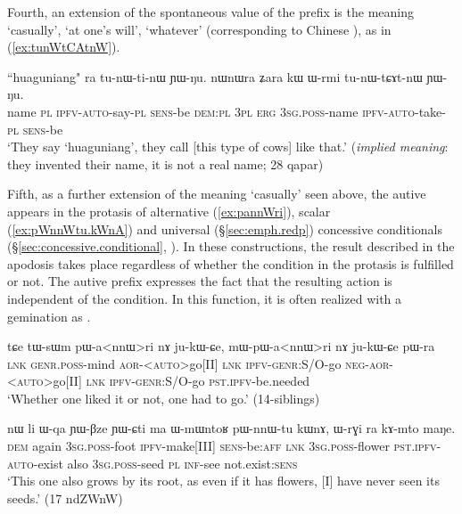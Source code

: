 Fourth, an extension of the spontaneous value of the prefix  is the meaning `casually', `at one's will', `whatever' (corresponding to Chinese ), as in (\ref{ex:tunWtCAtnW}). 

\begin{exe}
\ex \label{ex:tunWtCAtnW}
\gll ``huaguniang" ra tu-nɯ-ti-nɯ ɲɯ-ŋu. nɯnɯra ʑara kɯ ɯ-rmi tu-nɯ-tɕɤt-nɯ ɲɯ-ŋu.  \\
name \textsc{pl}	\textsc{ipfv}-\textsc{auto}-say-\textsc{pl}	\textsc{sens}-be	\textsc{dem}:\textsc{pl}	\textsc{3pl}	\textsc{erg}	\textsc{3sg}.\textsc{poss}-name	\textsc{ipfv}-\textsc{auto}-take-\textsc{pl}	\textsc{sens}-be\\
\glt `They say `huaguniang', they call [this type of cows] like that.' (\textit{implied meaning}: they invented their name, it is not a real name; 28 qapar) 
\end{exe}

Fifth, as a further extension of the meaning `casually' seen above, the autive appears in the protasis of alternative (\ref{ex:pannWri}), scalar (\ref{ex:pWnnWtu.kWnA}) and universal (§\ref{sec:emph.redp}) concessive conditionals (§\ref{sec:concessive.conditional}, \citealt[298--300]{jacques14linking}). In these constructions, the result described in the apodosis takes place regardless of whether the condition in the protasis is fulfilled or not. The autive prefix expresses the fact that the resulting action is independent of the condition. In this function, it is often realized with a gemination as .

\begin{exe}
\ex  \label{ex:pannWri}
\gll tɕe tɯ-sɯm pɯ-a<nnɯ>ri nɤ ju-kɯ-ɕe, mɯ-pɯ-a<nnɯ>ri nɤ ju-kɯ-ɕe pɯ-ra \\
\textsc{lnk} \textsc{genr}.\textsc{poss}-mind  \textsc{aor}-<\textsc{auto}>go[II] \textsc{lnk} \textsc{ipfv}-\textsc{genr}:S/O-go \textsc{neg}-\textsc{aor}-<\textsc{auto}>go[II] \textsc{lnk} \textsc{ipfv}-\textsc{genr}:S/O-go \textsc{pst}.\textsc{ipfv}-be.needed \\
\glt `Whether one liked it or not, one had to go.' (14-siblings) 
\end{exe}

 \begin{exe}
\ex  \label{ex:pWnnWtu.kWnA}
\gll nɯ li ɯ-qa ɲɯ-βze ɲɯ-ɕti ma ɯ-mɯntoʁ pɯ-nnɯ-tu kɯnɤ, ɯ-rɣi ra kɤ-mto maŋe.  \\
\textsc{dem} again \textsc{3sg}.\textsc{poss}-foot \textsc{ipfv}-make[III] \textsc{sens}-be:\textsc{aff} \textsc{lnk} \textsc{3sg}.\textsc{poss}-flower \textsc{pst}.\textsc{ipfv}-\textsc{auto}-exist also \textsc{3sg}.\textsc{poss}-seed \textsc{pl} \textsc{inf}-see not.exist:\textsc{sens} \\
\glt `This one also grows by its root, as even if it has flowers, [I] have never seen its seeds.' (17 ndZWnW)
\end{exe}

